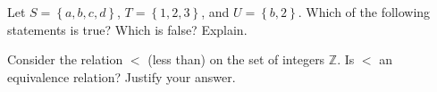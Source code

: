 \documentclass[11pt,answers,addpoints]{exam}
\def\set#1{\left\{ {#1} \right\}}
\def\Z{{\mathbb Z}}
\begin{document}
\begin{questions}

\newpage

\question[10] Let $S = \set{a,b,c,d}$, $T= \set{1,2,3}$, and $U = \set{b,2}$. Which of the following statements is true? Which is false? Explain.


\clearpage

\question[8] Consider the relation $<$ (less than) on the set of integers $\Z$. Is $<$ an equivalence relation? Justify your answer.

\begin{solution}[2.5in]
\end{solution}




\end{questions}
\end{document}
